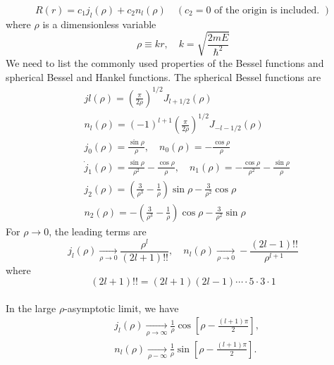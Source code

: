\documentclass{article}
\begin{document}
\begin{equation}
R(r)=c_{1} j_{l}(\rho)+c_{2} n_{l}(\rho) \quad\left(c_{2}=0 \text { of the origin is included. }\right)
\end{equation}
where $\rho$ is a dimensionless variable
\begin{equation}
\rho \equiv k r, \quad k=\sqrt{\frac{2 m E}{\hbar^{2}}}
\end{equation}
We need to list the commonly used properties of the Bessel functions and sphe\-ri\-cal Bessel and Hankel functions. The spherical Bessel functions are
\begin{equation}
\begin{aligned}
&j l(\rho)=\left(\frac{\pi}{2 \rho}\right)^{1 / 2} J_{l+1 / 2}(\rho) \\
&n_{l}(\rho)=(-1)^{l+1}\left(\frac{\pi}{2 \rho}\right)^{1 / 2} J_{-l-1 / 2}(\rho) \\
&j_{0}(\rho)=\frac{\sin \rho}{\rho}, \quad n_{0}(\rho)=-\frac{\cos \rho}{\rho} \\
&\dot{j}_{1}(\rho)=\frac{\sin \rho}{\rho^{2}}-\frac{\cos \rho}{\rho}, \quad n_{1}(\rho)=-\frac{\cos \rho}{\rho^{2}}-\frac{\sin \rho}{\rho} \\
&j_{2}(\rho)=\left(\frac{3}{\rho^{3}}-\frac{1}{\rho}\right) \sin \rho-\frac{3}{\rho^{2}} \cos \rho \\
&n_{2}(\rho)=-\left(\frac{3}{\rho^{3}}-\frac{1}{\rho}\right) \cos \rho-\frac{3}{\rho^{2}} \sin \rho
\end{aligned}
\end{equation}
For $\rho \rightarrow 0$, the leading terms are
\begin{equation}
j_l(\rho) \underset{\rho \rightarrow 0}{\longrightarrow} \frac{\rho^{l}}{(2 l+1) ! !}, \quad n_{l}(\rho) \underset{\rho \rightarrow 0}{\longrightarrow}-\frac{(2 l-1) ! !}{\rho^{l+1}}
\end{equation}
where
\begin{equation}
(2 l+1) ! !=(2 l+1)(2 l-1) \cdots \cdot 5 \cdot 3 \cdot 1
\end{equation}
\\
In the large $\rho$-asymptotic limit, we have
\begin{equation}
\begin{aligned}
&j_{l}(\rho) \underset{\rho \rightarrow \infty}{\longrightarrow} \frac{1}{\rho} \cos \left[\rho-\frac{(l+1) \pi}{2}\right], \\
&n_{l}(\rho) \underset{\rho-\infty}{\longrightarrow} \frac{1}{\rho} \sin \left[\rho-\frac{(l+1) \pi}{2}\right] .
\end{aligned}
\end{equation}
\end{document}
